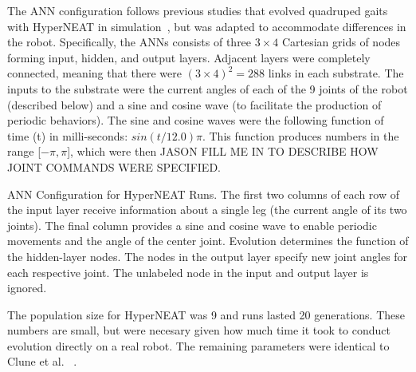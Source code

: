 \begin{itemize}
The ANN configuration follows previous studies that evolved quadruped gaits with HyperNEAT in simulation~\cite{clune2011performance, clune2009evolving}, but was adapted to accommodate differences in the robot. Specifically, the ANNs consists of three $3 \times 4$ Cartesian grids of nodes forming input, hidden, and output layers. Adjacent layers were completely connected, meaning that there were $(3 \times 4)^2= 288$ links in each substrate. The inputs to the substrate were the current angles of each of the 9 joints of the robot (described below) and a sine and cosine wave (to facilitate the production of periodic behaviors). The sine and cosine waves were the following function of time (t) in milli-seconds: $sin(t/12.0)\pi$. This function produces numbers in the range [$-\pi, \pi$], which were then JASON FILL ME IN TO DESCRIBE HOW JOINT COMMANDS WERE SPECIFIED. 



ANN Configuration for HyperNEAT Runs. The first two columns of each row of the input layer receive information about a single leg (the current angle of its two joints). The final column provides a sine and cosine wave to enable periodic movements and the angle of the center joint. Evolution determines the function of the hidden-layer nodes. The nodes in the output layer specify new joint angles for each respective joint. The unlabeled node in the input and output layer is ignored.  




The population size for HyperNEAT was 9 and runs lasted 20 generations. These numbers are small, but were necesary given how much time it took to conduct evolution directly on a real robot. The remaining parameters were identical to Clune et al. ~\cite{clune2011performance}.	

  



\end{itemize}

